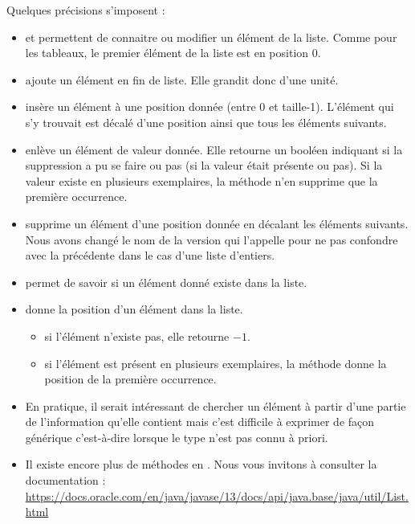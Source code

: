 Quelques précisions s’imposent :
\begin{itemize}
	\item
	       et 
	      permettent de connaitre ou modifier un élément de la liste.
	      Comme pour les tableaux, le premier élément de la liste est en position 0.
	\item
	      ajoute un élément en fin de liste.
	      Elle grandit donc d’une unité.
	\item
	      insère un élément à une position donnée (entre 0 et taille-1).
	      L’élément qui s’y trouvait est décalé d'une position
	      ainsi que tous les éléments suivants.
	\item
	      enlève un élément de valeur donnée.
	      Elle retourne un booléen indiquant si la suppression a pu se faire ou pas
	      (si la valeur était présente ou pas).
	      Si la valeur existe en plusieurs exemplaires,
	      la méthode n’en supprime que la première	occurrence.
	\item
	      supprime un élément d'une position donnée en décalant les éléments suivants.
	      Nous avons changé le nom de la version  qui l'appelle
	       pour ne pas confondre avec la précédente
	      dans le cas d'une liste d'entiers.
	\item
	      permet de savoir si un élément donné existe dans la liste.
	\item
	      donne la position d'un élément dans la liste.
	      \begin{itemize}
		      \item
		            si l’élément n’existe pas, elle retourne $-1$.
		      \item
		            si l’élément est présent en plusieurs exemplaires,
		            la méthode donne la position de la première occurrence.
	      \end{itemize}
	\item
	      En pratique, il serait intéressant de chercher un élément à partir d’une
	      partie de l’information qu’elle contient mais c’est difficile à
	      exprimer de façon générique c'est-à-dire lorsque le
		  type n'est pas connu à priori.
	\item 
		  Il existe encore plus de méthodes en .
		  Nous vous invitons à consulter la documentation :
		  \url{https://docs.oracle.com/en/java/javase/13/docs/api/java.base/java/util/List.html}
\end{itemize}

